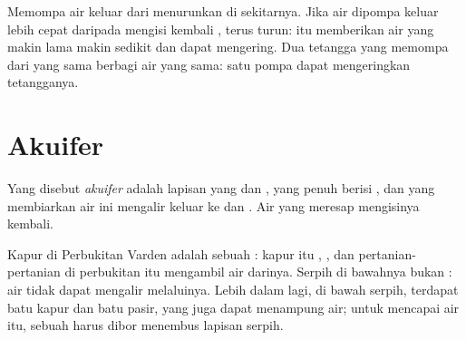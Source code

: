 \begin{remark}\label{rem:g6:water-underground:pumping}
Memompa air keluar dari  menurunkan  di sekitarnya. Jika
air dipompa keluar lebih cepat daripada  mengisi kembali ,
 terus turun:  itu memberikan air yang makin lama makin
sedikit dan dapat mengering. Dua tetangga yang memompa dari  yang sama
berbagi air yang sama: satu pompa dapat mengeringkan  tetangganya.
\end{remark}

\section{Akuifer}

\begin{definition}[Akuifer]\label{def:g6:water-underground:aquifer}
Yang disebut \emph{akuifer} adalah lapisan  yang 
dan , yang penuh berisi , dan yang membiarkan air ini
mengalir keluar ke  dan . Air  yang meresap mengisinya
kembali.
\end{definition}

Kapur di Perbukitan Varden adalah sebuah : kapur itu ,
, dan pertanian-pertanian di perbukitan itu mengambil air darinya.
Serpih di bawahnya bukan : air tidak dapat mengalir melaluinya. Lebih
dalam lagi, di bawah serpih, terdapat batu kapur dan batu pasir, yang juga
dapat menampung air; untuk mencapai air itu, sebuah  harus dibor
menembus lapisan serpih.

